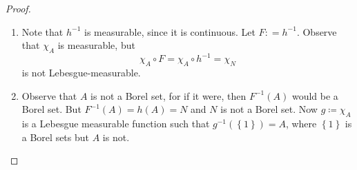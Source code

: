 \documentclass[../main.tex]{subfiles}
\begin{document}
\begin{proof}
\begin{enumerate}
\begin{note}
为一个趋于无穷的量加上1, 并不会显著改变它的数量级. 两个斜率的比值为 \(\frac{(3/2)^n + 1}{(3/2)^n} = 1 + (2/3)^n \to 1\).

这便解释了我们的直觉: "+x" 这个操作虽然修复了 \(f\) 对 \(C\) 补集测度的"压缩", 但对于 \(f\) 自身在 \(C\) 上的"测度生成"效应来说, 其*相对*影响是微不足道的. 因此, \(f\) 和 \(h\) 都将测度为零的集合 \(C\) "拉伸"成了一个测度为1的集合.
        \end{note}
        \(  h  \) is trictly increasing. Thus , h is a homeomorphism from \(  \left[ 0,1 \right]   \) onto \(  \left[ 0,2 \right]   \). Then \(  h  \) carries the open set \(  \left[ 0,1 \right]\setminus C   \) to an open set. And we have \[
      \begin{aligned}
        m\left( h\left( \left[ 0,1 \right]\setminus C  \right)  \right)&= m\left( h\left( \bigcup _{j,k}I_{j,k} \right)  \right)   \\ 
         &= \sum _{j,k}m\left( h\left( I_{j,k} \right) \right)\\ 
          &= \sum _{j,k}m\left( I_{j,k} \right) \\ 
          &= 1 
      \end{aligned}
        \] Therefore, \(  h  \) maps the Cantor set  to a set \(  P  \) with measure \(  1  \).  From Exercise \ref{9-7-2} , there exists a non-measurable set \(  N\subseteq P  \). Set \(  A= h^{-1} \left( N \right)   \). Since \(  h^{-1} \left( N \right)\subseteq h^{-1} \left( P \right)= C    \), \(  A  \)  is a subset of measure-zero set \(  C  \).  Thus \(  A  \) is Lebesgue-measurable. But \(  h\left( A \right)= N   \)  is not measurable.
        \item Note that \(  h^{-1}   \) is measurable, since it is continuous. Let \(  F: = h^{-1}   \).  Observe that \(  \chi _{A}  \) is measurable, but \[
        \chi _{A}\circ F= \chi _{A}\circ h^{-1} = \chi _{N}
        \]is not Lebesgue-measurable.
        \item Observe that \(  A  \) is not a Borel set, for if it were, then \(  F^{-1} \left( A \right)   \) would be a Borel set. But \(  F^{-1} \left( A \right)= h\left( A \right)= N    \) and \(  N  \) is not a Borel set. Now \(  g\coloneqq \chi _{A}   \) is a Lebesgue measurable function such that \(  g^{-1} \left( \left\{ 1 \right\} \right)= A   \), where \(  \left\{ 1 \right\}  \) is a Borel sets but \(  A  \) is not.      
    \end{enumerate}
    
\end{proof}
\end{document}
